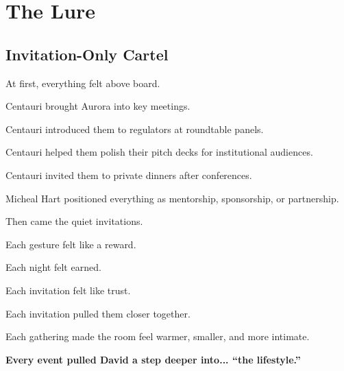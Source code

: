 \section{The Lure}

\subsection{Invitation-Only Cartel}

At first, everything felt above board.

Centauri brought Aurora into key meetings.  

Centauri introduced them to regulators at roundtable panels.  

Centauri helped them polish their pitch decks for institutional audiences.  

Centauri invited them to private dinners after conferences.

Micheal Hart positioned everything as mentorship, sponsorship, or partnership.

Then came the quiet invitations.

Each gesture felt like a reward. 

Each night felt earned. 

Each invitation felt like trust.

Each invitation pulled them closer together. 

Each gathering made the room feel warmer, smaller, and more intimate.  

\textbf{Every event pulled David a step deeper into... ``the lifestyle.''}

\medskip

